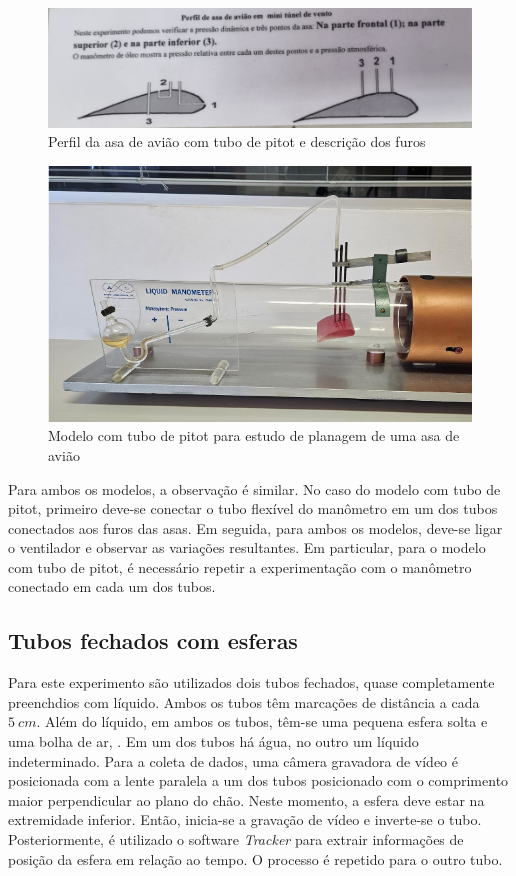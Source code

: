     \begin{figure}[H]
        \centering
        \includegraphics[width=0.35\linewidth]{fig/furos.jpeg}
        \caption{Perfil da asa de avião com tubo de pitot e descrição dos furos}
        \label{furos.png}
    \end{figure}
    \begin{figure}[H]
        \centering
        \includegraphics[width=0.35\linewidth]{fig/asa_pitot.png}
        \caption{Modelo com tubo de pitot para estudo de planagem de uma asa de avião}
        \label{asa_pitot.png}
    \end{figure}

    Para ambos os modelos, a observação é similar. No caso do modelo com tubo de pitot, primeiro deve-se conectar o tubo flexível do manômetro em um dos tubos conectados aos furos das asas. Em seguida, para ambos os modelos, deve-se ligar o ventilador e observar as variações resultantes. Em particular, para o modelo com tubo de pitot, é necessário repetir a experimentação com o manômetro conectado em cada um dos tubos.

\subsection{Tubos fechados com esferas}
    Para este experimento são utilizados dois tubos fechados, quase completamente preenchdios com líquido. Ambos os tubos têm marcações de distância a cada \(\qty{5}{cm}\). Além do líquido, em ambos os tubos, têm-se uma pequena esfera solta e uma bolha de ar, . Em um dos tubos há água, no outro um líquido indeterminado. Para a coleta de dados, uma câmera gravadora de vídeo é posicionada com a lente paralela a um dos tubos posicionado com o comprimento maior perpendicular ao plano do chão. Neste momento, a esfera deve estar na extremidade inferior. Então, inicia-se a gravação de vídeo e inverte-se o tubo. Posteriormente, é utilizado o software \textit{Tracker} para extrair informações de posição da esfera em relação ao tempo. O processo é repetido para o outro tubo. 

